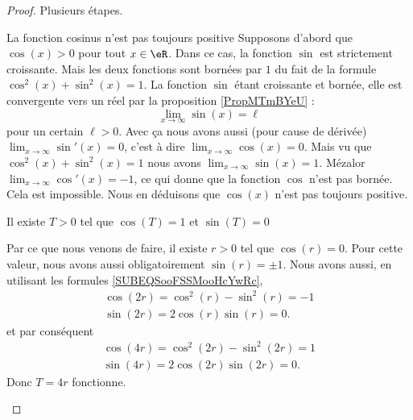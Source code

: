 \begin{proof}
    Plusieurs étapes.
    \begin{subproof}
        \item[La fonction cosinus n'est pas toujours positive]
    Supposons d'abord que \( \cos(x)>0\) pour tout \( x\in \eR\). Dans ce cas, la fonction \( \sin\) est strictement croissante. Mais les deux fonctions sont bornées par \( 1\) du fait de la formule \( \cos^2(x)+\sin^2(x)=1\). La fonction \( \sin\) étant croissante et bornée, elle est convergente vers un réel par la proposition \ref{PropMTmBYeU} :
    \begin{equation}
        \lim_{x\to \infty} \sin(x)=\ell
    \end{equation}
    pour un certain \( \ell>0\). Avec ça nous avons aussi (pour cause de dérivée) \( \lim_{x\to \infty} \sin'(x)=0\), c'est à dire \( \lim_{x\to \infty} \cos(x)=0\). Mais vu que \( \cos^2(x)+\sin^2(x)=1\) nous avons \( \lim_{x\to \infty} \sin(x)=1\). Mézalor \( \lim_{x\to \infty} \cos'(x)=-1\), ce qui donne que la fonction \( \cos\) n'est pas bornée. Cela est impossible. Nous en déduisons que \( \cos(x)\) n'est pas toujours positive.

\item[Il existe \( T>0\) tel que \( \cos(T)=1\) et \( \sin(T)=0\)]

    Par ce que nous venons de faire, il existe \( r>0\) tel que \( \cos(r)=0\). Pour cette valeur, nous avons aussi obligatoirement \( \sin(r)=\pm 1\). Nous avons aussi, en utilisant les formules \eqref{SUBEQSooFSSMooHcYwRc},
    \begin{subequations}
        \begin{align}
            \cos(2r)=\cos^2(r)-\sin^2(r)=-1\\
            \sin(2r)=2\cos(r)\sin(r)=0.
        \end{align}
    \end{subequations}
    et par conséquent
    \begin{subequations}
        \begin{align}
            \cos(4r)=\cos^2(2r)-\sin^2(2r)=1\\
            \sin(4r)=2\cos(2r)\sin(2r)=0.
        \end{align}
    \end{subequations}
    Donc \( T=4r\) fonctionne.


\end{subproof}
\end{proof}

